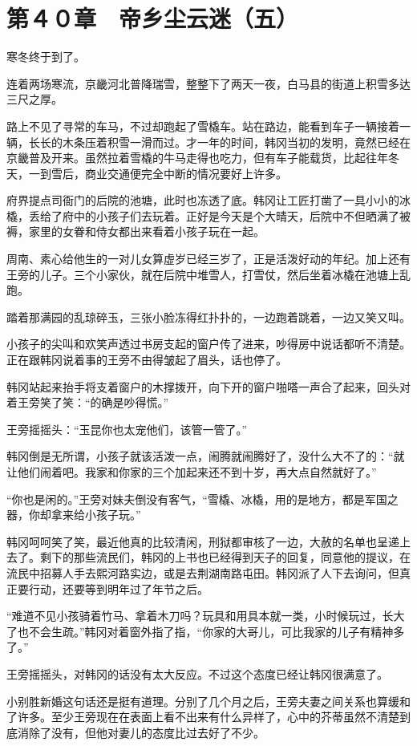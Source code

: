 \section{第４０章　帝乡尘云迷（五）}

寒冬终于到了。

连着两场寒流，京畿河北普降瑞雪，整整下了两天一夜，白马县的街道上积雪多达三尺之厚。

路上不见了寻常的车马，不过却跑起了雪橇车。站在路边，能看到车子一辆接着一辆，长长的木条压着积雪一滑而过。才一年的时间，韩冈当初的发明，竟然已经在京畿普及开来。虽然拉着雪橇的牛马走得也吃力，但有车子能载货，比起往年冬天，一到雪后，商业交通便完全中断的情况要好上许多。

府界提点司衙门的后院的池塘，此时也冻透了底。韩冈让工匠打凿了一具小小的冰橇，丢给了府中的小孩子们去玩着。正好是今天是个大晴天，后院中不但晒满了被褥，家里的女眷和侍女都出来看着小孩子玩在一起。

周南、素心给他生的一对儿女算虚岁已经三岁了，正是活泼好动的年纪。加上还有王旁的儿子。三个小家伙，就在后院中堆雪人，打雪仗，然后坐着冰橇在池塘上乱跑。

踏着那满园的乱琼碎玉，三张小脸冻得红扑扑的，一边跑着跳着，一边又笑又叫。

小孩子的尖叫和欢笑声透过书房支起的窗户传了进来，吵得房中说话都听不清楚。正在跟韩冈说着事的王旁不由得皱起了眉头，话也停了。

韩冈站起来抬手将支着窗户的木撑拨开，向下开的窗户啪嗒一声合了起来，回头对着王旁笑了笑：“的确是吵得慌。”

王旁摇摇头：“玉昆你也太宠他们，该管一管了。”

韩冈倒是无所谓，小孩子就该活泼一点，闹腾就闹腾好了，没什么大不了的：“就让他们闹着吧。我家和你家的三个加起来还不到十岁，再大点自然就好了。”

“你也是闲的。”王旁对妹夫倒没有客气，“雪橇、冰橇，用的是地方，都是军国之器，你却拿来给小孩子玩。”

韩冈呵呵笑了笑，最近他真的比较清闲，刑狱都审核了一边，大赦的名单也呈递上去了。剩下的那些流民们，韩冈的上书也已经得到天子的回复，同意他的提议，在流民中招募人手去熙河路实边，或是去荆湖南路屯田。韩冈派了人下去询问，但真正要行动，还要等到明年过了年节之后。

“难道不见小孩骑着竹马、拿着木刀吗？玩具和用具本就一类，小时候玩过，长大了也不会生疏。”韩冈对着窗外指了指，“你家的大哥儿，可比我家的儿子有精神多了。”

王旁摇摇头，对韩冈的话没有太大反应。不过这个态度已经让韩冈很满意了。

小别胜新婚这句话还是挺有道理。分别了几个月之后，王旁夫妻之间关系也算缓和了许多。至少王旁现在在表面上看不出来有什么异样了，心中的芥蒂虽然不清楚到底消除了没有，但他对妻儿的态度比过去好了不少。

